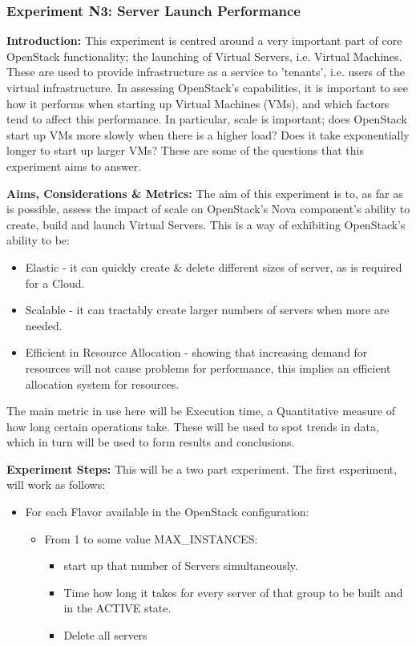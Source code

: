 \subsubsection{Experiment N3: Server Launch Performance}

\textbf{Introduction:}
This experiment is centred around a very important part of core OpenStack functionality; the launching of Virtual Servers, i.e. Virtual Machines. These are used to provide infrastructure as a service to 'tenants', i.e. users of the virtual infrastructure. 
In assessing OpenStack's capabilities, it is important to see how it performs when starting up Virtual Machines (VMs), and which factors tend to affect this performance. In particular, scale is important; does OpenStack start up VMs more slowly when there is a higher load? Does it take exponentially longer to start up larger VMs? These are some of the questions that this experiment aims to answer. 

\textbf{Aims, Considerations \& Metrics:}
The aim of this experiment is to, as far as is possible, assess the impact of scale on OpenStack's Nova component's ability to create, build and launch Virtual Servers. This is a way of exhibiting OpenStack's ability to be:

\begin{itemize}
\itemsep0em
\item Elastic - it can quickly create \& delete different sizes of server, as is required for a Cloud.
\item Scalable - it can tractably create larger numbers of servers when more are needed.
\item Efficient in Resource Allocation - showing that increasing demand for resources will not cause problems for performance, this implies an efficient allocation system for resources. 
\end{itemize}

The main metric in use here will be Execution time, a Quantitative measure of how long certain operations take. These will be used to spot trends in data, which in turn will be used to form results and conclusions. 

\textbf{Experiment Steps:}
This will be a two part experiment. The first experiment, will work as follows:
\begin{itemize}
\itemsep0em
\item For each Flavor available in the OpenStack configuration:
	\begin{itemize}
	\itemsep0em
	\item From 1 to some value MAX\_INSTANCES:
		\begin{itemize}
		\itemsep0em
		\item start up that number of Servers simultaneously. 
		\item Time how long it takes for every server of that group to be built and in the ACTIVE state. 
		\item Delete all servers 
		\end{itemize}		  
	\end{itemize}
\end{itemize}


